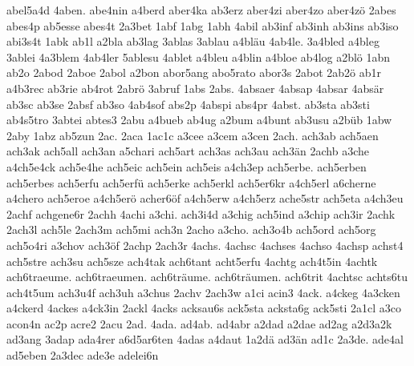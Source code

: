 {    abel5a4d
    4aben.
    abe4nin
    a4berd
    aber4ka
    ab3erz
    aber4zi
    aber4zo
    aber4zö
    2abes
    abes4p
    ab5esse
    abes4t
    2a3bet
    1abf
    1abg
    1abh
    4abil
    ab3inf
    ab3inh
    ab3ins
    ab3iso
    abi3s4t
    1abk
    ab1l
    a2bla
    ab3lag
    3ablas
    3ablau
    a4bläu
    4ab4le.
    3a4bled
    a4bleg
    3ablei
    4a3blem
    4ab4ler
    5ablesu
    4ablet
    a4bleu
    a4blin
    a4bloe
    ab4log
    a2blö
    1abn
    ab2o
    2abod
    2aboe
    2abol
    a2bon
    abor5ang
    abo5rato
    abor3s
    2abot
    2ab2ö
    ab1r
    a4b3rec
    ab3rie
    ab4rot
    2abrö
    3abruf
    1abs
    2abs.
    4absaer
    4absap
    4absar
    4absär
    ab3sc
    ab3se
    2absf
    ab3so
    4ab4sof
    abs2p
    4abspi
    abs4pr
    4abst.
    ab3sta
    ab3sti
    ab4s5tro
    3abtei
    abtes3
    2abu
    a4bueb
    ab4ug
    a2bum
    a4bunt
    ab3usu
    a2büb
    1abw
    2aby
    1abz
    ab5zun
    2ac.
    2aca
    1ac1c
    a3cee
    a3cem
    a3cen
    2ach.
    ach3ab
    ach5aen
    ach3ak
    ach5all
    ach3an
    a5chari
    ach5art
    ach3as
    ach3au
    ach3än
    2achb
    a3che
    a4ch5e4ck
    ach5e4he
    ach5eic
    ach5ein
    ach5eis
    a4ch3ep
    ach5erbe.
    ach5erben
    ach5erbes
    ach5erfu
    ach5erfü
    ach5erke
    ach5erkl
    ach5er6kr
    a4ch5erl
    a6cherne
    a4chero
    ach5eroe
    a4ch5erö
    acher6öf
    a4ch5erw
    a4ch5erz
    ache5str
    ach5eta
    a4ch3eu
    2achf
    achgene6r
    2achh
    4achi
    a3chi.
    ach3i4d
    a3chig
    ach5ind
    a3chip
    ach3ir
    2achk
    2ach3l
    ach5le
    2ach3m
    ach5mi
    ach3n
    2acho
    a3cho.
    ach3o4b
    ach5ord
    ach5org
    ach5o4ri
    a3chov
    ach3öf
    2achp
    2ach3r
    4achs.
    4achsc
    4achses
    4achso
    4achsp
    achst4
    ach5stre
    ach3su
    ach5sze
    ach4tak
    ach6tant
    acht5erfu
    4achtg
    ach4t5in
    4achtk
    ach6traeume.
    ach6traeumen.
    ach6träume.
    ach6träumen.
    ach6trit
    4achtsc
    achts6tu
    ach4t5um
    ach3u4f
    ach3uh
    a3chus
    2achv
    2ach3w
    a1ci
    acin3
    4ack.
    a4ckeg
    4a3cken
    a4ckerd
    4ackes
    a4ck3in
    2ackl
    4acks
    acksau6s
    ack5sta
    acksta6g
    ack5sti
    2a1cl
    a3co
    acon4n
    ac2p
    acre2
    2acu
    2ad.
    4ada.
    ad4ab.
    ad4abr
    a2dad
    a2dae
    ad2ag
    a2d3a2k
    ad3ang
    3adap
    ada4rer
    a6d5ar6ten
    4adas
    a4daut
    1a2dä
    ad3än
    ad1c
    2a3de.
    ade4al
    ad5eben
    2a3dec
    ade3e
    adelei6n
}
